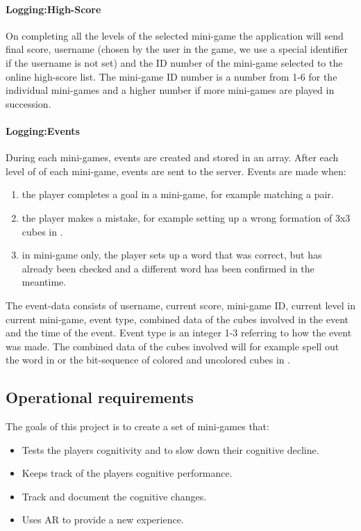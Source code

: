 \paragraph{Logging:High-Score}
On completing all the levels of the selected mini-game the application will send final score, username (chosen by the user in the game, we use a special identifier if the username is not set) and the ID number of the mini-game selected to the online high-score list. The mini-game ID number is a number from 1-6 for the individual mini-games and a higher number if more mini-games are played in succession.
\paragraph{Logging:Events}
During each mini-games, events are created and stored in an array. After each level of of each mini-game, events are sent to the server.
Events are made when:
\begin{enumerate}
	\item the player completes a goal in a mini-game, for example matching a pair.
	\item the player makes a mistake, for example setting up a wrong formation of 3x3 cubes in .
	\item in  mini-game only, the player sets up a word that was correct, but has already been checked and a different word has been confirmed in the meantime.
\end{enumerate}
The event-data consists of username, current score, mini-game ID, current level in current mini-game, event type, combined data of the cubes involved in the event and the time of the event. Event type is an integer 1-3 referring to how the event was made. The combined data of the cubes involved will for example spell out the word in  or the bit-sequence of colored and uncolored cubes in .\\

\subsection{Operational requirements}
The goals of this project is to create a set of mini-games that:
\begin{itemize}
	\item Tests the players cognitivity and to slow down their cognitive decline.
	\item Keeps track of the players cognitive performance.
	\item Track and document the cognitive changes.
	\item Uses AR to provide a new experience.
\end{itemize}

